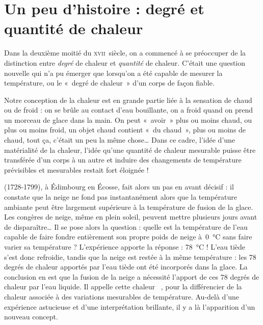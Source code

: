 \atstartofhistorysection
\section[Un peu d’histoire : degré et quantité  de chaleur]{Un peu d’histoire :\onlyamphibook{\\} degré et quantité  de chaleur}
\label{ch_histoire_quantite_chaleur_depondt}


	Dans la deuxième moitié du \textsc{xvii}\ieme\ siècle, on a commencé à se préoccuper de la distinction entre \emph{degré} de chaleur et \emph{quantité} de chaleur. C'était une question nouvelle qui n'a pu émerger que lorsqu'on a été capable de mesurer la température, ou le «~degré de chaleur~» d'un corps de façon fiable.

	Notre conception de la chaleur est en grande partie liée à la sensation de chaud ou de froid : on se brûle au contact d'eau bouillante, on a froid quand on prend un morceau de glace dans la main. On peut «~avoir~» plus ou moins chaud, ou plus ou moins froid, un objet chaud contient «~du chaud~», plus ou moins de chaud, tout ça, c'était un peu la même chose… Dans ce cadre, l'idée d'une matérialité de la chaleur, l'idée qu'une quantité de chaleur mesurable puisse être transférée d'un corps à un autre et induire des changements de température prévisibles et mesurables restait fort éloignée !

	 (1728-1799), à Édimbourg en Écosse, fait alors un pas en avant décisif : il constate que la neige ne fond pas instantanément alors que la température ambiante peut être largement supérieure à la température de fusion de la glace. Les congères de neige, même en plein soleil, peuvent mettre plusieurs jours avant de disparaître… Il se pose alors la question : quelle est la température de l’eau capable de faire fondre entièrement son propre poids de neige à~\SI{0}{\degreeCelsius} sans faire varier sa température ? L’expérience apporte la réponse : \SI{78}{\degreeCelsius} ! L'eau tiède s'est donc refroidie, tandis que la neige est restée à la même température : les 78 degrés de chaleur apportés par l'eau tiède ont été incorporés dans la glace. La conclusion en est que la fusion de la neige a nécessité l'apport de ces 78 degrés de chaleur par l'eau liquide. Il appelle cette chaleur ~\cite{locqueneux1996}, pour la différencier de la chaleur  associée à des variations mesurables de température. Au-delà d'une expérience astucieuse et d'une interprétation brillante, il y a là l'apparition d'un nouveau concept.

